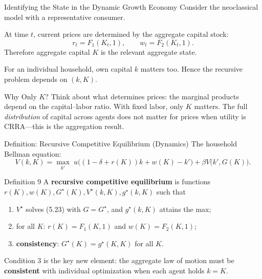 \documentclass[aspectratio=169,10pt]{beamer}
\newcommand{\apxbutton}[1]{\hfill\hyperlink{#1}{\beamerbutton{Appendix}}}
\begin{document}
\begin{frame}{Identifying the State in the Dynamic Growth Economy}
Consider the neoclassical model with a representative consumer.

\medskip
At time $t$, current prices are determined by the aggregate capital stock:
\[
r_t=F_1(K_t,1), \qquad w_t=F_2(K_t,1).
\]
Therefore aggregate capital $K$ is the relevant aggregate state.

\medskip
For an individual household, own capital $k$ matters too. Hence the recursive problem depends on $(k,K)$.

\begin{block}{Why Only $K$?}
Think about what determines prices: the marginal products depend on the capital--labor ratio. With fixed labor, only $K$ matters. The full \emph{distribution} of capital across agents does not matter for prices when utility is CRRA---this is the aggregation result.
\end{block}
\end{frame}

\begin{frame}{Definition: Recursive Competitive Equilibrium (Dynamics)}
\hypertarget{m-a8}{}
The household Bellman equation:
\[
V(k,K)
=
\max_{k'}\;
u\big((1-\delta+r(K))k+w(K)-k'\big)
+\beta V\big(k',G(K)\big).
\tag{5.23}
\]

\begin{block}{Definition 9}
A \textbf{recursive competitive equilibrium} is functions $r(K), w(K), G^\star(K), V^\star(k,K), g^\star(k,K)$ such that
\begin{enumerate}
  \item $V^\star$ solves (5.23) with $G=G^\star$, and $g^\star(k,K)$ attains the max;
  \item for all $K$: $r(K)=F_1(K,1)$ and $w(K)=F_2(K,1)$;
  \item \textbf{consistency}: $G^\star(K)=g^\star(K,K)$ for all $K$.
\end{enumerate}
\end{block}

\medskip
Condition 3 is the key new element: the aggregate law of motion must be \textbf{consistent} with individual optimization when each agent holds $k=K$.
\apxbutton{a8}
\end{frame}
\end{document}
